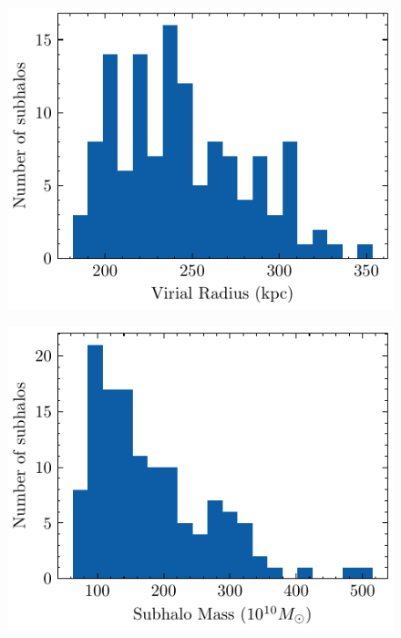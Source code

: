 \begin{figure}
	\centering
	\begin{minipage}[b]{0.45\linewidth}
		\centering
		\includegraphics[width=\linewidth]{pic/numsubhalo}
		\subcaption{}
		\label{fig:numsubhalo}
	\end{minipage}
	\begin{minipage}[b]{0.45\linewidth}
		\centering
		\includegraphics[width=\linewidth]{pic/EstimatedSubhaloMass}
		\subcaption{}
		\label{fig:estimatedsubhalomass}
	\end{minipage}
	\caption{}
	\label{}
\end{figure}


